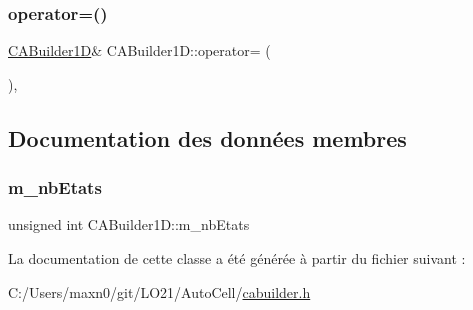 \subsubsection{\texorpdfstring{operator=()}{operator=()}}
{\footnotesize\ttfamily \mbox{\hyperlink{class_c_a_builder1_d}{C\+A\+Builder1D}}\& C\+A\+Builder1\+D\+::operator= (\begin{DoxyParamCaption}\item[{const \mbox{\hyperlink{class_c_a_builder1_d}{C\+A\+Builder1D}} \&}]{ }\end{DoxyParamCaption})\hspace{0.3cm}{\ttfamily [private]}, {\ttfamily [delete]}}



\subsection{Documentation des données membres}
\mbox{\label{class_c_a_builder1_d_a50193db158de49187b1a377fcbff6250}} 
\subsubsection{\texorpdfstring{m\+\_\+nb\+Etats}{m\_nbEtats}}
{\footnotesize\ttfamily unsigned int C\+A\+Builder1\+D\+::m\+\_\+nb\+Etats\hspace{0.3cm}{\ttfamily [private]}}



La documentation de cette classe a été générée à partir du fichier suivant \+:\begin{DoxyCompactItemize}
\item 
C\+:/\+Users/maxn0/git/\+L\+O21/\+Auto\+Cell/\mbox{\hyperlink{cabuilder_8h}{cabuilder.\+h}}\end{DoxyCompactItemize}
